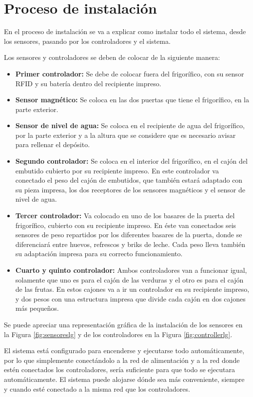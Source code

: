 \section{Proceso de instalación}
En el proceso de instalación se va a explicar como instalar todo el sistema, desde los sensores, pasando por los controladores y el sistema.

Los sensores y controladores se deben de colocar de la siguiente manera:

\begin{itemize}
    \item \textbf{Primer controlador:} Se debe de colocar fuera del frigorífico, con su sensor RFID y su batería dentro del recipiente impreso.
    \item \textbf{Sensor magnético:}  Se coloca en las dos puertas que tiene el frigorífico, en la parte exterior.
    \item \textbf{Sensor de nivel de agua:} Se coloca en el recipiente de agua del frigorífico, por la parte exterior y a la altura que se considere que es necesario avisar para rellenar el depósito.
    \item \textbf{Segundo controlador:} Se coloca en el interior del frigorífico, en el cajón del embutido cubierto por su recipiente impreso. En este controlador va conectado el peso del cajón de embutidos, que también estará adaptado con su pieza impresa, los dos receptores de los sensores magnéticos y el sensor de nivel de agua.
    \item \textbf{Tercer controlador:} Va colocado en uno de los basares de la puerta del frigorífico, cubierto con su recipiente impreso. En éste van conectados seis sensores de peso repartidos por los diferentes basares de la puerta, donde se diferenciará entre huevos, refrescos y briks de leche. Cada peso lleva también su adaptación impresa para su correcto funcionamiento.
    \item \textbf{Cuarto y quinto controlador:} Ambos controladores van a funcionar igual, solamente que uno es para el cajón de las verduras y el otro es para el cajón de las frutas. En estos cajones va a ir un controlador en su recipiente impreso, y dos pesos con una estructura impresa que divide cada cajón en dos cajones más pequeños.
\end{itemize}

Se puede apreciar una representación gráfica de la instalación de los sensores en la Figura \ref{fig:sensoreslg} y de los controladores en la Figura \ref{fig:controllerlg}.

El sistema está configurado para encenderse y ejecutarse todo automáticamente, por lo que simplemente conectándolo a la red de alimentación y a la red donde estén conectados los controladores, sería suficiente para que todo se ejecutara automáticamente. El sistema puede alojarse dónde sea más conveniente, siempre y cuando esté conectado a la misma red que los controladores.
